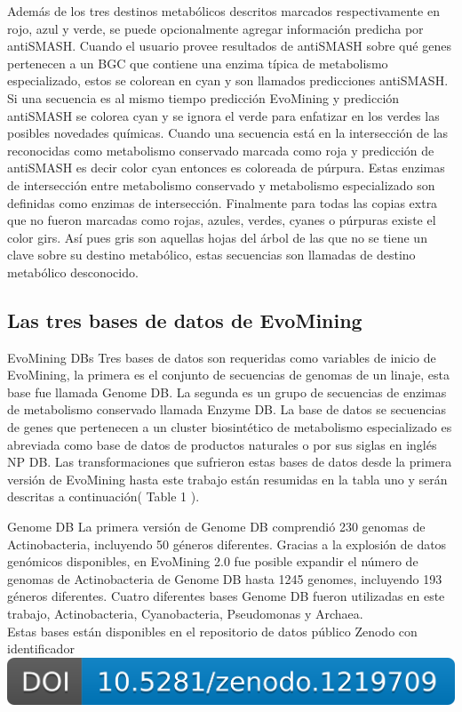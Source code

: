 \documentclass[12pt,twoside]{reedthesis}
\begin{document}
  Además de los tres destinos metabólicos descritos marcados
  respectivamente en rojo, azul y verde, se puede opcionalmente agregar
  información predicha por antiSMASH. Cuando el usuario provee resultados
  de antiSMASH sobre qué genes pertenecen a un BGC que contiene una enzima
  típica de metabolismo especializado, estos se colorean en cyan y son
  llamados predicciones antiSMASH. Si una secuencia es al mismo tiempo
  predicción EvoMining y predicción antiSMASH se colorea cyan y se ignora
  el verde para enfatizar en los verdes las posibles novedades químicas.
  Cuando una secuencia está en la intersección de las reconocidas como
  metabolismo conservado marcada como roja y predicción de antiSMASH es
  decir color cyan entonces es coloreada de púrpura. Estas enzimas de
  intersección entre metabolismo conservado y metabolismo especializado
  son definidas como enzimas de intersección. Finalmente para todas las
  copias extra que no fueron marcadas como rojas, azules, verdes, cyanes o
  púrpuras existe el color girs. Así pues gris son aquellas hojas del
  árbol de las que no se tiene un clave sobre su destino metabólico, estas
  secuencias son llamadas de destino metabólico desconocido.
  
  \subsection{Las tres bases de datos de
  EvoMining}\label{las-tres-bases-de-datos-de-evomining}
  
  EvoMining DBs Tres bases de datos son requeridas como variables de
  inicio de EvoMining, la primera es el conjunto de secuencias de genomas
  de un linaje, esta base fue llamada Genome DB. La segunda es un grupo de
  secuencias de enzimas de metabolismo conservado llamada Enzyme DB. La
  base de datos se secuencias de genes que pertenecen a un cluster
  biosintético de metabolismo especializado es abreviada como base de
  datos de productos naturales o por sus siglas en inglés NP DB. Las
  transformaciones que sufrieron estas bases de datos desde la primera
  versión de EvoMining hasta este trabajo están resumidas en la tabla uno
  y serán descritas a continuación( Table 1 ).
  
  Genome DB La primera versión de Genome DB comprendió 230 genomas de
  Actinobacteria, incluyendo 50 géneros diferentes. Gracias a la explosión
  de datos genómicos disponibles, en EvoMining 2.0 fue posible expandir el
  número de genomas de Actinobacteria de Genome DB hasta 1245 genomes,
  incluyendo 193 géneros diferentes. Cuatro diferentes bases Genome DB
  fueron utilizadas en este trabajo, Actinobacteria, Cyanobacteria,
  Pseudomonas y Archaea.\\
  Estas bases están disponibles en el repositorio de datos público Zenodo
  con identificador
  \href{https://doi.org/10.5281/zenodo.1219709}{\includegraphics{chapter2/zenodo_1219709.png}}
  
\end{document}
